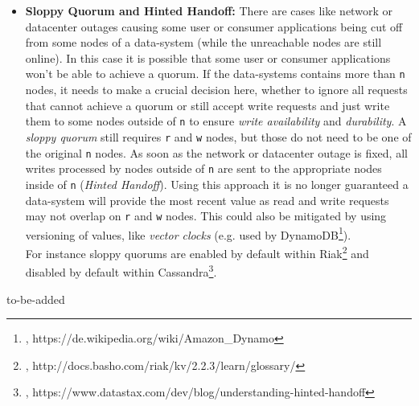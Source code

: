 {\begin{itemize}
\item \textbf{Sloppy Quorum and Hinted Handoff:} There are cases like network or datacenter outages causing some user or consumer applications being cut off from some nodes of a data-system (while the unreachable nodes are still online). In this case it is possible that some user or consumer applications won't be able to achieve a quorum. If the data-systems contains more than \lstinline{n} nodes, it needs to make a crucial decision here, whether to ignore all requests that cannot achieve a quorum or still accept write requests and just write them to some nodes outside of \lstinline{n} to ensure \textit{write availability} and \textit{durability}. A \textit{sloppy quorum} still requires \lstinline{r} and \lstinline{w} nodes, but those do not need to be one of the original \lstinline{n} nodes. As soon as the network or datacenter outage is fixed, all writes processed by nodes outside of \lstinline{n} are sent to the appropriate nodes inside of \lstinline{n} (\textit{Hinted Handoff}). Using this approach it is no longer guaranteed a data-system will provide the most recent value as read and write requests may not overlap on \lstinline{r} and \lstinline{w} nodes. This could also be mitigated by using versioning of values, like \textit{vector clocks} (e.g. used by DynamoDB\footnote{\cite{DYNVC}, https://de.wikipedia.org/wiki/Amazon\_Dynamo}).\\
For instance sloppy quorums are enabled by default within Riak\footnote{\cite{RIASQ}, http://docs.basho.com/riak/kv/2.2.3/learn/glossary/} and disabled by default within Cassandra\footnote{\cite{CASSSQ}, https://www.datastax.com/dev/blog/understanding-hinted-handoff}.\\
\end{itemize}

to-be-added
\newpage
}
